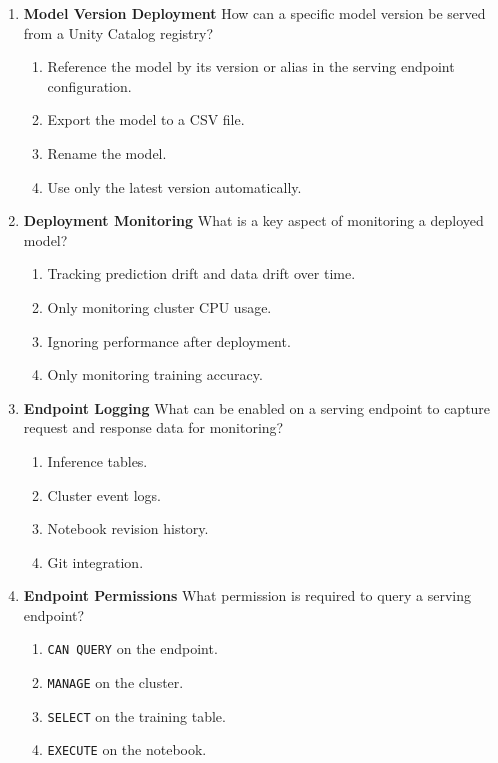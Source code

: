 \documentclass{article}
\begin{document}
\begin{enumerate}[label=\textbf{Q\arabic*.}]
		\item \textbf{Model Version Deployment}
		How can a specific model version be served from a Unity Catalog registry?
		\begin{enumerate}[label=\Alph*.]
			\item Reference the model by its version or alias in the serving endpoint configuration.
			\item Export the model to a CSV file.
			\item Rename the model.
			\item Use only the latest version automatically.
		\end{enumerate}
		
		\item \textbf{Deployment Monitoring}
		What is a key aspect of monitoring a deployed model?
		\begin{enumerate}[label=\Alph*.]
			\item Tracking prediction drift and data drift over time.
			\item Only monitoring cluster CPU usage.
			\item Ignoring performance after deployment.
			\item Only monitoring training accuracy.
		\end{enumerate}
		
		\item \textbf{Endpoint Logging}
		What can be enabled on a serving endpoint to capture request and response data for monitoring?
		\begin{enumerate}[label=\Alph*.]
			\item Inference tables.
			\item Cluster event logs.
			\item Notebook revision history.
			\item Git integration.
		\end{enumerate}
		
		\item \textbf{Endpoint Permissions}
		What permission is required to query a serving endpoint?
		\begin{enumerate}[label=\Alph*.]
			\item \texttt{CAN QUERY} on the endpoint.
			\item \texttt{MANAGE} on the cluster.
			\item \texttt{SELECT} on the training table.
			\item \texttt{EXECUTE} on the notebook.
		\end{enumerate}
		
	\end{enumerate}
	
\end{document}
